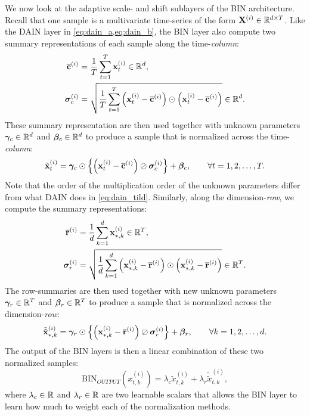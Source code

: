 \documentclass{statsmsc}
\begin{document}
{We now look at the adaptive scale- and shift sublayers of the \ac{BIN} architecture.
Recall that one sample is a multivariate time-series of the form $\mathbf{X}^{(i)} \in \mathbb{R}^{d \times T}$.
Like the \ac{DAIN} layer in \cref{eq:dain_a,eq:dain_b}, the \ac{BIN} layer also
compute two summary representations of each sample along the time-\textit{column}:
\begin{align}
    \overline{\mathbf{c}}^{(i)}& =\frac{1}{T} \sum^{T}_{t=1} \mathbf{x}_t^{(i)} \in \mathbb{R}^d, \\
    \bm\sigma_c^{(i)}&=\sqrt{
    \frac{1}{T} \sum^{T}_{t=1} \left(\mathbf{x}^{(i)}_{t} - \overline{\mathbf{c}}^{(i)} \right)
    \odot \left(\mathbf{x}^{(i)}_{t} - \overline{\mathbf{c}}^{(i)} \right)
} \in \mathbb{R}^d.
\end{align}
These summary representation are then used together with unknown parameters
$\bm\gamma_c \in \mathbb{R}^d$ and $\bm\beta_c \in \mathbb{R}^d$ to produce a sample that is normalized across
the time-\textit{column}:
\begin{equation}
    \tilde{\mathbf{x}}^{(i)}_t= \bm\gamma_c \odot \left\{
        \left(\mathbf{x}^{(i)}_t - \overline{\mathbf{c}}^{(i)}\right)\oslash \bm\sigma_c^{(i)}
    \right\}+\bm\beta_c, \qquad \forall t=1,2,\dots,T.
\end{equation}
Note that the order of the multiplication order of the unknown parameters differ from what
\ac{DAIN} does in \cref{eq:dain_tild}. Similarly, along the dimension-\textit{row}, we compute
the summary representations:
\begin{align}
    \overline{\mathbf{r}}^{(i)}& =\frac{1}{d} \sum^{d}_{k=1} \mathbf{x}_{*,k}^{(i)} \in \mathbb{R}^T, \\
    \bm\sigma_r^{(i)}&=\sqrt{
        \frac{1}{d} \sum^{d}_{k=1} \left(\mathbf{x}^{(i)}_{*,k} - \overline{\mathbf{r}}^{(i)} \right)
        \odot \left(\mathbf{x}^{(i)}_{*,k} - \overline{\mathbf{r}}^{(i)} \right)
    } \in \mathbb{R}^T.
\end{align}
The row-summaries are then used together with new unknown parameters
$\bm\gamma_r \in \mathbb{R}^T$ and $\bm\beta_r \in \mathbb{R}^T$ to produce
a sample that is normalized across the dimension-\textit{row}:
\begin{equation}
    \tilde{\tilde{\mathbf{x}}}^{(i)}_{*,k}= \bm\gamma_r \odot \left\{
        \left(\mathbf{x}^{(i)}_{*,k} - \overline{\mathbf{r}}^{(i)}\right)\oslash \bm\sigma_r^{(i)}
    \right\}+\bm\beta_r, \qquad \forall k=1,2,\dots,d.
\end{equation}
The output of the \ac{BIN} layers is then a linear combination of these two normalized samples:
\begin{equation}
    \textrm{BIN}_{OUTPUT}\left( x_{t,k}^{(i)}\right)
    = \lambda_c \tilde{x}^{(i)}_{t,k} + \lambda_r \tilde{\tilde{x}}^{(i)}_{t,k},
\end{equation}
where $\lambda_c \in \mathbb{R}$ and $\lambda_r\in\mathbb{R}$ are two learnable scalars that allows the \ac{BIN} layer
to learn how much to weight each of the normalization methods.


}
\end{document}
